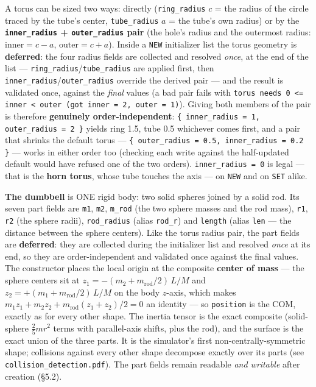 \documentclass[11pt]{article}
\newcommand{\kw}[1]{\texttt{\uppercase{#1}}}
\newcommand{\code}[1]{\texttt{#1}}
\begin{document}
A torus can be sized two ways: directly (\code{ring\_radius} $c$ = the
radius of the circle traced by the tube's center, \code{tube\_radius}
$a$ = the tube's own radius) or by the \textbf{\code{inner\_radius} +
\code{outer\_radius} pair} (the hole's radius and the outermost
radius: $\mathrm{inner} = c - a$, $\mathrm{outer} = c + a$). Inside a
\kw{new} initializer list the torus geometry is \textbf{deferred}: the
four radius fields are collected and resolved \emph{once}, at the end
of the list --- \code{ring\_radius}/\code{tube\_radius} are applied
first, then \code{inner\_radius}/\code{outer\_radius} override the
derived pair --- and the result is validated once, against the
\emph{final} values (a bad pair fails with \code{torus needs 0 <=
inner < outer (got inner = 2, outer = 1)}). Giving both members of the
pair is therefore \textbf{genuinely order-independent}:
\code{\{ inner\_radius = 1, outer\_radius = 2 \}} yields ring 1.5,
tube 0.5 whichever comes first, and a pair that shrinks the default
torus --- \code{\{ outer\_radius = 0.5, inner\_radius = 0.2 \}} ---
works in either order too (checking each write against the
half-updated default would have refused one of the two orders).
\code{inner\_radius = 0} is legal --- that is the \textbf{horn torus},
whose tube touches the axis --- on \kw{new} and on \kw{set} alike.

\textbf{The dumbbell} is ONE rigid body: two solid spheres joined by
a solid rod. Its seven part fields are \code{m1}, \code{m2},
\code{m\_rod} (the two sphere masses and the rod mass), \code{r1},
\code{r2} (the sphere radii), \code{rod\_radius} (alias
\code{rod\_r}) and \code{length} (alias \code{len} --- the distance
between the sphere centers). Like the torus radius pair, the part
fields are \textbf{deferred}: they are collected during the
initializer list and resolved \emph{once} at its end, so they are
order-independent and validated once against the final values. The
constructor places the local origin at the composite \textbf{center
of mass} --- the sphere centers sit at
$z_1 = -(m_2 + m_{\mathrm{rod}}/2)\,L/M$ and
$z_2 = +(m_1 + m_{\mathrm{rod}}/2)\,L/M$ on the body $z$-axis, which
makes $m_1 z_1 + m_2 z_2 + m_{\mathrm{rod}}(z_1+z_2)/2 = 0$ an
identity --- so \code{position} is the COM, exactly as for every
other shape. The inertia tensor is the exact composite (solid-sphere
$\tfrac25 m r^2$ terms with parallel-axis shifts, plus the rod), and
the surface is the exact union of the three parts. It is the
simulator's first non-centrally-symmetric shape; collisions against
every other shape decompose exactly over its parts (see
\code{collision\_detection.pdf}). The part fields remain readable
\emph{and writable} after creation (\S5.2).
\end{document}

